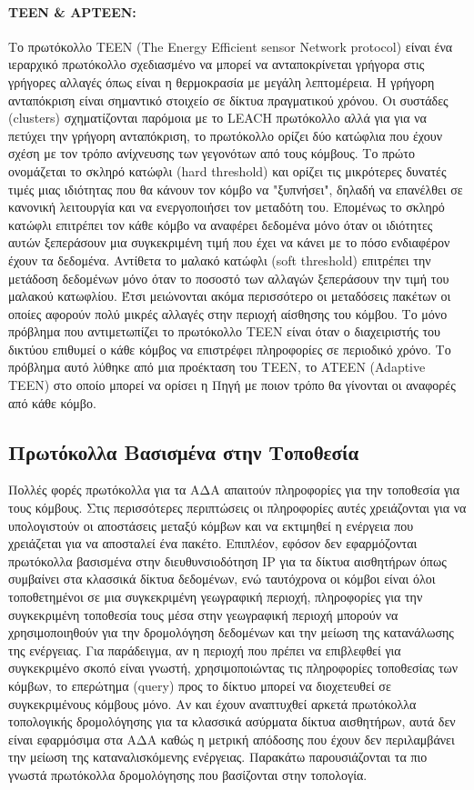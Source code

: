 \paragraph{TEEN \& APTEEN:} Το πρωτόκολλο TEEN (The Energy Efficient sensor Network protocol) \cite{teen_protocol} είναι ένα
ιεραρχικό πρωτόκολλο σχεδιασμένο να μπορεί να ανταποκρίνεται γρήγορα στις γρήγορες αλλαγές όπως είναι η θερμοκρασία με μεγάλη λεπτομέρεια. Η γρήγορη ανταπόκριση είναι
σημαντικό στοιχείο σε δίκτυα πραγματικού χρόνου. Οι συστάδες (clusters) σχηματίζονται παρόμοια με το LEACH πρωτόκολλο αλλά για για να πετύχει την γρήγορη ανταπόκριση,
το πρωτόκολλο ορίζει δύο κατώφλια που έχουν σχέση με τον τρόπο ανίχνευσης των γεγονότων από τους κόμβους. Το πρώτο ονομάζεται το σκληρό κατώφλι (hard threshold) και
ορίζει τις μικρότερες δυνατές τιμές μιας ιδιότητας που θα κάνουν τον κόμβο να "ξυπνήσει", δηλαδή να επανέλθει σε κανονική λειτουργία και να ενεργοποιήσει τον μεταδότη
του. Επομένως το σκληρό κατώφλι επιτρέπει τον κάθε κόμβο να αναφέρει δεδομένα μόνο όταν οι ιδιότητες αυτών ξεπεράσουν μια συγκεκριμένη τιμή που έχει να κάνει με το
πόσο ενδιαφέρον έχουν τα δεδομένα. Αντίθετα το μαλακό κατώφλι (soft threshold) επιτρέπει την μετάδοση δεδομένων μόνο όταν το ποσοστό των αλλαγών ξεπεράσουν την τιμή
του μαλακού κατωφλίου. Έτσι μειώνονται ακόμα περισσότερο οι μεταδόσεις πακέτων οι οποίες αφορούν πολύ μικρές αλλαγές στην περιοχή αίσθησης του κόμβου. Το μόνο
πρόβλημα που αντιμετωπίζει το πρωτόκολλο TEEN είναι όταν ο διαχειριστής του δικτύου επιθυμεί ο κάθε κόμβος να επιστρέφει πληροφορίες σε περιοδικό χρόνο. Το πρόβλημα
αυτό λύθηκε από μια προέκταση του TEEN, το ATEEN (Adaptive TEEN) \cite{apteen_protocol} στο οποίο μπορεί να ορίσει η Πηγή με ποιον τρόπο θα γίνονται οι αναφορές από
κάθε κόμβο.


\subsection{Πρωτόκολλα Βασισμένα στην Τοποθεσία}
Πολλές φορές πρωτόκολλα για τα ΑΔΑ απαιτούν πληροφορίες για την τοποθεσία για τους κόμβους.
Στις περισσότερες περιπτώσεις οι πληροφορίες αυτές χρειάζονται για να υπολογιστούν οι αποστάσεις μεταξύ κόμβων και να εκτιμηθεί η ενέργεια που χρειάζεται για να
αποσταλεί ένα πακέτο.
Επιπλέον, εφόσον δεν εφαρμόζονται πρωτόκολλα βασισμένα στην διευθυνσιοδότηση IP για τα δίκτυα αισθητήρων όπως συμβαίνει στα κλασσικά δίκτυα δεδομένων, ενώ ταυτόχρονα
οι κόμβοι είναι όλοι τοποθετημένοι σε μια συγκεκριμένη γεωγραφική περιοχή, πληροφορίες για την συγκεκριμένη τοποθεσία τους μέσα στην γεωγραφική περιοχή μπορούν
να χρησιμοποιηθούν για την δρομολόγηση δεδομένων και την μείωση της κατανάλωσης της ενέργειας.
Για παράδειγμα, αν η περιοχή που πρέπει να επιβλεφθεί για συγκεκριμένο σκοπό είναι γνωστή, χρησιμοποιώντας τις πληροφορίες τοποθεσίας των κόμβων, το επερώτημα (query)
προς το δίκτυο μπορεί να διοχετευθεί σε συγκεκριμένους κόμβους μόνο.
Αν και έχουν αναπτυχθεί αρκετά πρωτόκολλα τοπολογικής δρομολόγησης για τα κλασσικά ασύρματα δίκτυα αισθητήρων, αυτά δεν είναι εφαρμόσιμα στα ΑΔΑ καθώς η μετρική
απόδοσης που έχουν δεν περιλαμβάνει την μείωση της καταναλισκόμενης ενέργειας. Παρακάτω παρουσιάζονται τα πιο γνωστά πρωτόκολλα δρομολόγησης που βασίζονται στην
τοπολογία.


